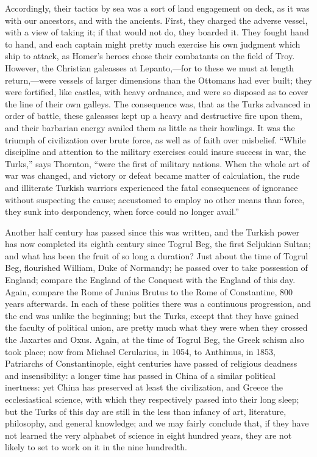 Accordingly, their tactics by
sea was a sort of land engagement on deck, as it was with our
ancestors, and with the ancients. First, they charged the adverse
vessel, with a view of taking it; if that would not do, they boarded
it. They fought hand to hand, and each captain might pretty much
exercise his own judgment which ship to attack, as Homer's heroes
chose their combatants on the field of Troy. However, the Christian
galeasses at Lepanto,—for to these we must at length
return,—were vessels of larger dimensions than the Ottomans had ever
built; they were fortified, like castles, with heavy ordnance, and
were so disposed as to cover the line of their own galleys. The
consequence was, that as the Turks advanced in order of battle, these
galeasses kept up a heavy and destructive fire upon them, and their
barbarian energy availed them as little as their howlings. It was the
triumph of civilization over brute force, as well as of faith over
misbelief. ``While discipline and attention to the military exercises
could insure success in war, the Turks,'' says Thornton, ``were the
first of military nations. When the whole art of war was changed, and
victory or defeat became matter of calculation, the rude and
illiterate Turkish warriors experienced the fatal consequences of
ignorance without suspecting the cause; accustomed to employ no other
means than force, they sunk into despondency, when force could no
longer avail.''

Another half century has
passed since this was written, and the Turkish power has now completed
its eighth century since Togrul Beg, the first Seljukian Sultan; and
what has been the fruit of so long a duration? Just about the time of
Togrul Beg, flourished William, Duke of Normandy; he passed over to
take possession of England; compare the England of the Conquest with
the England of this day. Again, compare the Rome of Junius Brutus to
the Rome of Constantine, 800 years afterwards. In each of these
polities there was a continuous progression, and the end was unlike
the beginning; but the Turks, except that they have gained the faculty
of political union, are pretty much what they were when they crossed
the Jaxartes and Oxus. Again, at the time of Togrul Beg, the Greek
schism also took place; now from Michael Cerularius, in 1054, to
Anthimus, in 1853, Patriarchs of Constantinople, eight centuries have
passed of religious deadness and insensibility: a longer time has
passed in China of a similar political inertness: yet China has
preserved at least the civilization, and Greece the ecclesiastical
science, with which they respectively passed into their long sleep;
but the Turks of this day are still in the less than infancy of art,
literature, philosophy, and general knowledge; and we may fairly
conclude that, if they have not learned the very alphabet of science
in eight hundred years, they are not likely to set to work on it in
the nine hundredth.

